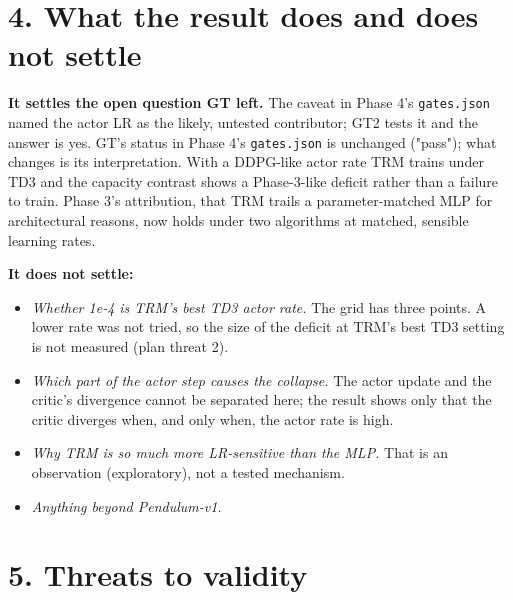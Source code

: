 \documentclass[11pt]{article}
\begin{document}
\section*{4. What the result does and does not settle}



\textbf{It settles the open question GT left.} The caveat in Phase 4's \texttt{gates.json} named the actor LR as the likely, untested contributor; GT2 tests it and the answer is yes. GT's status in Phase 4's \texttt{gates.json} is unchanged ("pass"); what changes is its interpretation. With a DDPG-like actor rate TRM trains under TD3 and the capacity contrast shows a Phase-3-like deficit rather than a failure to train. Phase 3's attribution, that TRM trails a parameter-matched MLP for architectural reasons, now holds under two algorithms at matched, sensible learning rates.



\textbf{It does not settle:}



\begin{itemize}
\item \emph{Whether 1e-4 is TRM's best TD3 actor rate.} The grid has three points. A lower rate was not tried, so the size of the deficit at TRM's best TD3 setting is not measured (plan threat 2).
\item \emph{Which part of the actor step causes the collapse.} The actor update and the critic's divergence cannot be separated here; the result shows only that the critic diverges when, and only when, the actor rate is high.
\item \emph{Why TRM is so much more LR-sensitive than the MLP.} That is an observation (exploratory), not a tested mechanism.
\item \emph{Anything beyond Pendulum-v1.}
\end{itemize}



\section*{5. Threats to validity}
\end{document}
